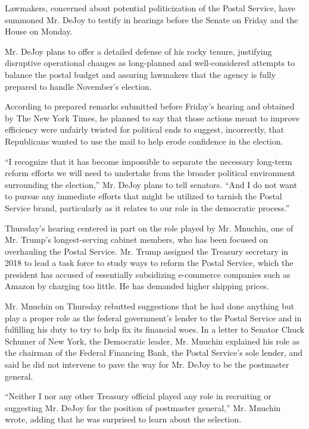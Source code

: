 Lawmakers, concerned about potential politicization of the Postal
Service, have summoned Mr. DeJoy to testify in hearings before the
Senate on Friday and the House on Monday.

Mr. DeJoy plans to offer a detailed defense of his rocky tenure,
justifying disruptive operational changes as long-planned and
well-considered attempts to balance the postal budget and assuring
lawmakers that the agency is fully prepared to handle November's
election.

According to prepared remarks submitted before Friday's hearing and
obtained by The New York Times, he planned to say that those actions
meant to improve efficiency were unfairly twisted for political ends to
suggest, incorrectly, that Republicans wanted to use the mail to help
erode confidence in the election.

``I recognize that it has become impossible to separate the necessary
long-term reform efforts we will need to undertake from the broader
political environment surrounding the election,'' Mr. DeJoy plans to
tell senators. ``And I do not want to pursue any immediate efforts that
might be utilized to tarnish the Postal Service brand, particularly as
it relates to our role in the democratic process.''

Thursday's hearing centered in part on the role played by Mr. Mnuchin,
one of Mr. Trump's longest-serving cabinet members, who has been focused
on overhauling the Postal Service. Mr. Trump assigned the Treasury
secretary in 2018 to lead a task force to study ways to reform the
Postal Service, which the president has accused of essentially
subsidizing e-commerce companies such as Amazon by charging too little.
He has demanded higher shipping prices.

Mr. Mnuchin on Thursday rebutted suggestions that he had done anything
but play a proper role as the federal government's lender to the Postal
Service and in fulfilling his duty to try to help fix its financial
woes. In a letter to Senator Chuck Schumer of New York, the Democratic
leader, Mr. Mnuchin explained his role as the chairman of the Federal
Financing Bank, the Postal Service's sole lender, and said he did not
intervene to pave the way for Mr. DeJoy to be the postmaster general.

``Neither I nor any other Treasury official played any role in
recruiting or suggesting Mr. DeJoy for the position of postmaster
general,'' Mr. Mnuchin wrote, adding that he was surprised to learn
about the selection.

